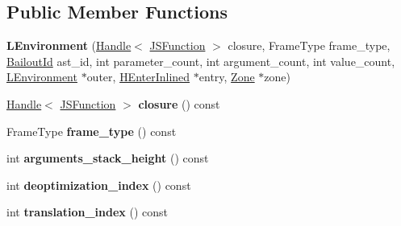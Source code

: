\subsection*{Public Member Functions}
\begin{DoxyCompactItemize}
\item 
{\bfseries L\+Environment} (\hyperlink{classv8_1_1internal_1_1_handle}{Handle}$<$ \hyperlink{classv8_1_1internal_1_1_j_s_function}{J\+S\+Function} $>$ closure, Frame\+Type frame\+\_\+type, \hyperlink{classv8_1_1internal_1_1_bailout_id}{Bailout\+Id} ast\+\_\+id, int parameter\+\_\+count, int argument\+\_\+count, int value\+\_\+count, \hyperlink{classv8_1_1internal_1_1_l_environment}{L\+Environment} $\ast$outer, \hyperlink{classv8_1_1internal_1_1_h_enter_inlined}{H\+Enter\+Inlined} $\ast$entry, \hyperlink{classv8_1_1internal_1_1_zone}{Zone} $\ast$zone)\hypertarget{classv8_1_1internal_1_1_l_environment_ab1f77b02a2e408d57b1d02914dcec3ea}{}\label{classv8_1_1internal_1_1_l_environment_ab1f77b02a2e408d57b1d02914dcec3ea}

\item 
\hyperlink{classv8_1_1internal_1_1_handle}{Handle}$<$ \hyperlink{classv8_1_1internal_1_1_j_s_function}{J\+S\+Function} $>$ {\bfseries closure} () const \hypertarget{classv8_1_1internal_1_1_l_environment_a9b85b61122cdd34b915099e232198ada}{}\label{classv8_1_1internal_1_1_l_environment_a9b85b61122cdd34b915099e232198ada}

\item 
Frame\+Type {\bfseries frame\+\_\+type} () const \hypertarget{classv8_1_1internal_1_1_l_environment_a29c67a876c6a72d20bc36cdafbae8a4a}{}\label{classv8_1_1internal_1_1_l_environment_a29c67a876c6a72d20bc36cdafbae8a4a}

\item 
int {\bfseries arguments\+\_\+stack\+\_\+height} () const \hypertarget{classv8_1_1internal_1_1_l_environment_aa71ae38cc452e6b16218c4df733d6412}{}\label{classv8_1_1internal_1_1_l_environment_aa71ae38cc452e6b16218c4df733d6412}

\item 
int {\bfseries deoptimization\+\_\+index} () const \hypertarget{classv8_1_1internal_1_1_l_environment_addfb950ec3932ac07737813274ba33be}{}\label{classv8_1_1internal_1_1_l_environment_addfb950ec3932ac07737813274ba33be}

\item 
int {\bfseries translation\+\_\+index} () const \hypertarget{classv8_1_1internal_1_1_l_environment_a0ab26bfa841f306f233a67f9b9d67881}{}\label{classv8_1_1internal_1_1_l_environment_a0ab26bfa841f306f233a67f9b9d67881}


\end{DoxyCompactItemize}

